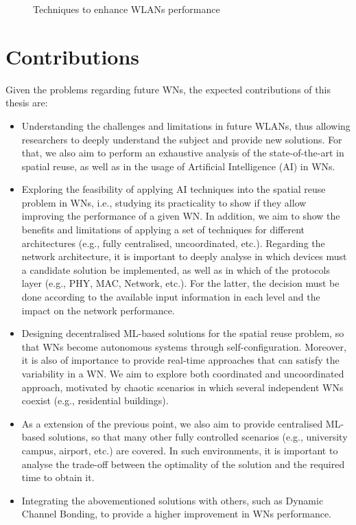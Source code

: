 \documentclass[12pt, a4paper,twoside]{tesi_upf}
\begin{document}
			\begin{figure}[h!]
				\centering
				\caption{Techniques to enhance WLANs performance}
				\label{fig:techniques_wns}
			\end{figure}	
		
		\section{Contributions}
		\label{section:contributions}
			Given the problems regarding future WNs, the expected contributions of this thesis are:	
			\begin{itemize}
				\item Understanding the challenges and limitations in future WLANs, thus allowing researchers to deeply understand the subject and provide new solutions. For that, we also aim to perform an exhaustive analysis of the state-of-the-art in spatial reuse, as well as in the usage of Artificial Intelligence (AI) in WNs.  			
				\item Exploring the feasibility of applying AI techniques into the spatial reuse problem in WNs, i.e., studying its practicality to show if they allow improving the performance of a given WN. In addition, we aim to show the benefits and limitations of applying a set of techniques for different architectures (e.g., fully centralised, uncoordinated, etc.). Regarding the network architecture, it is important to deeply analyse in which devices must a candidate solution be implemented, as well as in which of the protocols layer (e.g., PHY, MAC, Network, etc.). For the latter, the decision must be done according to the available input information in each level and the impact on the network performance.					
				\item Designing decentralised ML-based solutions for the spatial reuse problem, so that WNs become autonomous systems through self-configuration. Moreover, it is also of importance to provide real-time approaches that can satisfy the variability in a WN. We aim to explore both coordinated and uncoordinated approach, motivated by chaotic scenarios in which several independent WNs coexist (e.g., residential buildings).
				\item As a extension of the previous point, we also aim to provide centralised ML-based solutions, so that many other fully controlled scenarios (e.g., university campus, airport, etc.) are covered. In such environments, it is important to analyse the trade-off between the optimality of the solution and the required time to obtain it.
				\item Integrating the abovementioned solutions with others, such as Dynamic Channel Bonding, to provide a higher improvement in WNs performance.
			\end{itemize}		
			
\end{document}
